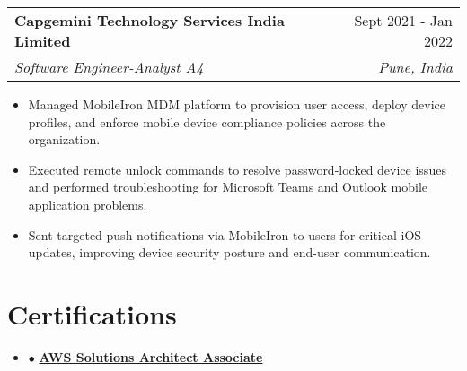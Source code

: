 \documentclass[letterpaper,11pt]{article}
\makeatletter
\newcommand{\resumeItem}[1]{
  \item\small{
    {#1 \vspace{-2pt}}
  }
}
\newcommand{\resumeSubheading}[4]{
  \vspace{-2pt}\item
    \begin{tabular*}{0.97\textwidth}[t]{l@{\extracolsep{\fill}}r}
      \textbf{#1} & #2 \\
      \textit{\small#3} & \textit{\small #4} \\
    \end{tabular*}\vspace{-7pt}
}
\newcommand{\resumeProjectHeading}[2]{
    \item
    \begin{tabular*}{0.97\textwidth}{l@{\extracolsep{\fill}}r}
      \small#1 & #2 \\
    \end{tabular*}\vspace{-7pt}
}
\newcommand{\resumeSubHeadingListStart}{\begin{itemize}[leftmargin=0.15in, label={}]}
\newcommand{\resumeSubHeadingListEnd}{\end{itemize}}
\newcommand{\resumeItemListStart}{\begin{itemize}}
\newcommand{\resumeItemListEnd}{\end{itemize}\vspace{-5pt}}
\makeatother
\begin{document}
    \resumeSubheading
      {Capgemini Technology Services India Limited}{Sept 2021 - Jan 2022}
      {Software Engineer-Analyst A4}{Pune, India}
      \resumeItemListStart
        \resumeItem {Managed MobileIron MDM platform to provision user access, deploy device profiles, and enforce mobile device compliance policies across the organization.}
\resumeItem {Executed remote unlock commands to resolve password-locked device issues and performed troubleshooting for Microsoft Teams and Outlook mobile application problems.}
\resumeItem {

Sent targeted push notifications via MobileIron to users for critical iOS updates, improving device security posture and end-user communication.

}
      \resumeItemListEnd




\section{Certifications}
\resumeSubHeadingListStart
    \item {\small$\bullet$ \hspace{0.5em} \href{https://www.credly.com/badges/1d8aa7bc-aa55-4e80-88a4-a9d45014cc88/linked_in_profile}{\textbf{AWS Solutions Architect Associate}}}
\resumeSubHeadingListEnd
\end{document}
